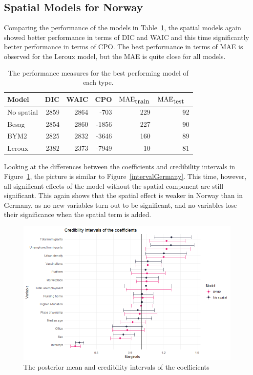 \subsection{Spatial Models for Norway}\label{sec:spatial_norway}
Comparing the performance of the models in Table~\ref{allNorway}, the spatial models again showed better performance in terms of DIC and WAIC and this time significantly better performance in terms of CPO. The best performance in terms of MAE is observed for the Leroux model, but the MAE is quite close for all models.
\begin{table}[H] 
\caption{The performance measures for the best performing model of each type. \label{allNorway}}
\begin{tabular}{l r r r r r}
\toprule
\textbf{Model}	& \textbf{DIC}	& \textbf{WAIC} & \textbf{CPO} & \textbf{$\hbox{MAE}_{\hbox{train}}$} & \textbf{$\hbox{MAE}_{\hbox{test}}$}\ \\
\midrule
No spatial & 2859 & 2864 & -703 & 229 & 92 \\
Besag & 2854 & 2860 & -1856 & 227 & 90 \\
BYM2 & 2825 & 2832 & -3646 & 160 & 89\\
Leroux & 2382 & 2373 & -7949 & 10 & 81\\
\bottomrule
\end{tabular}
\end{table}
Looking at the differences between the coefficients and credibility intervals in Figure~\ref{intervalNorway}, the picture is similar to Figure~\ref{intervalGermany}. This time, however, all significant effects of the model without the spatial component are still significant. This again shows that the spatial effect is weaker in Norway than in Germany, as no new variables turn out to be significant, and no variables lose their significance when the spatial term is added.
\begin{figure}[H]
  \centering
  \includegraphics[width = \textwidth]{intervals_norway.png}
  \caption{The posterior mean and credibility intervals of the coefficients}
  \label{intervalNorway}
\end{figure}
